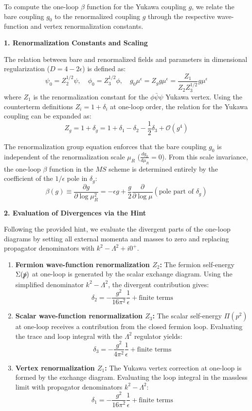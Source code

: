 To compute the one-loop $\beta$ function for the Yukawa coupling $g$, we relate the bare coupling $g_0$ to the renormalized coupling $g$ through the respective wave-function and vertex renormalization constants.

\textbf{1. Renormalization Constants and Scaling}

The relation between bare and renormalized fields and parameters in dimensional regularization ($D = 4 - 2\epsilon$) is defined as:
\[
    \psi_0 = Z_2^{1/2} \psi, \quad \phi_0 = Z_3^{1/2} \phi, \quad g_0 \mu^\epsilon = Z_g g \mu^\epsilon = \frac{Z_1}{Z_2 Z_3^{1/2}} g \mu^\epsilon
\]
where $Z_1$ is the renormalization constant for the $\phi\bar{\psi}\psi$ Yukawa vertex.
Using the counterterm definitions $Z_i = 1 + \delta_i$ at one-loop order, the relation for the Yukawa coupling can be expanded as:
\[
    Z_g = 1 + \delta_g = 1 + \delta_1 - \delta_2 - \frac{1}{2}\delta_3 + \mathcal{O}(g^4)
\]

The renormalization group equation enforces that the bare coupling $g_0$ is independent of the renormalization scale $\mu_R$ ($\frac{d g_0}{d \mu_R} = 0$). From this scale invariance, the one-loop $\beta$ function in the $MS$ scheme is determined entirely by the coefficient of the $1/\epsilon$ pole in $\delta_g$:
\[
    \beta(g) \equiv \frac{\partial g}{\partial \log \mu_R^2} = -\epsilon g + \frac{g}{2} \frac{\partial}{\partial \log \mu} (\text{pole part of } \delta_g)
\]

\textbf{2. Evaluation of Divergences via the Hint}

Following the provided hint, we evaluate the divergent parts of the one-loop diagrams by setting all external momenta and masses to zero and replacing propagator denominators with $k^2 - \Lambda^2 + i0^+$.

\begin{enumerate}
    \item \textbf{Fermion wave-function renormalization $Z_2$:}
          The fermion self-energy $\Sigma(\slashed{p})$ at one-loop is generated by the scalar exchange diagram. Using the simplified denominator $k^2 - \Lambda^2$, the divergent contribution gives:
          \[
              \delta_2 = -\frac{g^2}{16\pi^2} \frac{1}{\epsilon} + \text{finite terms}
          \]

    \item \textbf{Scalar wave-function renormalization $Z_3$:}
          The scalar self-energy $\Pi(p^2)$ at one-loop receives a contribution from the closed fermion loop. Evaluating the trace and loop integral with the $\Lambda^2$ regulator yields:
          \[
              \delta_3 = -\frac{g^2}{4\pi^2} \frac{1}{\epsilon} + \text{finite terms}
          \]

    \item \textbf{Vertex renormalization $Z_1$:}
          The Yukawa vertex correction at one-loop is formed by the exchange diagram. Evaluating the loop integral in the massless limit with propagator denominators $k^2 - \Lambda^2$:
          \[
              \delta_1 = -\frac{g^2}{16\pi^2} \frac{1}{\epsilon} + \text{finite terms}
          \]
\end{enumerate}


